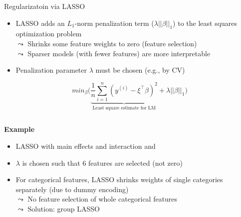 \documentclass[11pt,compress,t,notes=noshow, aspectratio=169, xcolor=table]{beamer}
\begin{document}
\begin{frame}{Regularizatoin via LASSO }
\begin{itemize}
    \item LASSO adds an $L_1$-norm penalization term ($\lambda||\beta||_1$) to the least squares optimization problem\\
    $\leadsto$ Shrinks some feature weights to zero (feature selection)\\
    $\leadsto$ Sparser models (with fewer features) are more interpretable
    \item Penalization parameter $\lambda$ must be chosen (e.g., by CV) %
\end{itemize}
$$
min_{\beta} \bigg(\underbrace{\frac{1}{n} \sum_{i=1}^{n} (y^{(i)} - {\xi}^{\top} \beta)^2}_\text{Least square estimate for LM} + \lambda||\beta||_1\bigg)
$$
\pause
\begin{columns}[T, totalwidth=\linewidth]
\begin{column}{0.65\textwidth}
\textbf{Example}
\begin{itemize}
    \item LASSO with main effects and interaction  and 
    \item $\lambda$ is chosen such that 6 features are selected (not zero)
    \item For categorical features, LASSO shrinks weights of single categories separately (due to dummy encoding)\\
    $\leadsto$ No feature selection of whole categorical features\\
    $\leadsto$ Solution: group LASSO 
\end{itemize}
\end{column}
\begin{column}{0.35\textwidth}

\end{column}
\end{columns}
\end{frame}
\end{document}
